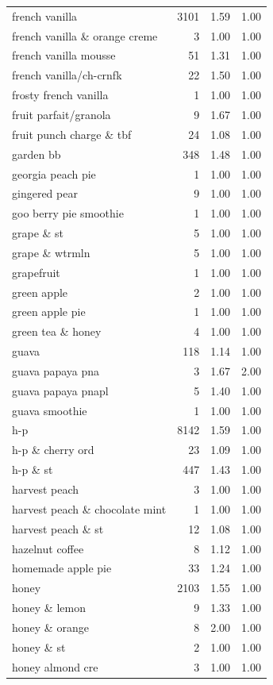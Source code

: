 \begin{table}
\begin{tabular}{lrrr}
french vanilla & 3101 & 1.59 & 1.00 \\
french vanilla \& orange creme & 3 & 1.00 & 1.00 \\
french vanilla mousse & 51 & 1.31 & 1.00 \\
french vanilla/ch-crnfk & 22 & 1.50 & 1.00 \\
frosty french vanilla & 1 & 1.00 & 1.00 \\
fruit parfait/granola & 9 & 1.67 & 1.00 \\
fruit punch charge \& tbf & 24 & 1.08 & 1.00 \\
garden bb & 348 & 1.48 & 1.00 \\
georgia peach pie & 1 & 1.00 & 1.00 \\
gingered pear & 9 & 1.00 & 1.00 \\
goo berry pie smoothie & 1 & 1.00 & 1.00 \\
grape \& st & 5 & 1.00 & 1.00 \\
grape \& wtrmln & 5 & 1.00 & 1.00 \\
grapefruit & 1 & 1.00 & 1.00 \\
green apple & 2 & 1.00 & 1.00 \\
green apple pie & 1 & 1.00 & 1.00 \\
green tea \& honey & 4 & 1.00 & 1.00 \\
guava & 118 & 1.14 & 1.00 \\
guava papaya pna & 3 & 1.67 & 2.00 \\
guava papaya pnapl & 5 & 1.40 & 1.00 \\
guava smoothie & 1 & 1.00 & 1.00 \\
h-p & 8142 & 1.59 & 1.00 \\
h-p \& cherry ord & 23 & 1.09 & 1.00 \\
h-p \& st & 447 & 1.43 & 1.00 \\
harvest peach & 3 & 1.00 & 1.00 \\
harvest peach \& chocolate mint & 1 & 1.00 & 1.00 \\
harvest peach \& st & 12 & 1.08 & 1.00 \\
hazelnut coffee & 8 & 1.12 & 1.00 \\
homemade apple pie & 33 & 1.24 & 1.00 \\
honey & 2103 & 1.55 & 1.00 \\
honey \& lemon & 9 & 1.33 & 1.00 \\
honey \& orange & 8 & 2.00 & 1.00 \\
honey \& st & 2 & 1.00 & 1.00 \\
honey almond cre & 3 & 1.00 & 1.00 \\

\end{tabular}
\end{table}
